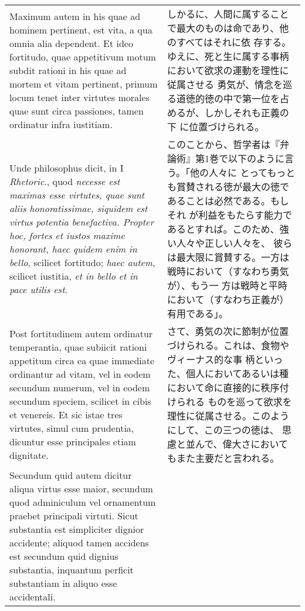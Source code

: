 \documentclass[10pt]{jsarticle}
\begin{document}
\begin{longtable}{p{21em}p{21em}}
\\


Maximum autem in his quae ad hominem pertinent, est vita, a qua omnia
alia dependent. Et ideo fortitudo, quae appetitivum motum subdit
rationi in his quae ad mortem et vitam pertinent, primum locum tenet
inter virtutes morales quae sunt circa passiones, tamen ordinatur
infra iustitiam.

&

しかるに、人間に属することで最大のものは命であり、他のすべてはそれに依
存する。ゆえに、死と生に属する事柄において欲求の運動を理性に従属させる
勇気が、情念を巡る道徳的徳の中で第一位を占めるが、しかしそれも正義の下
に位置づけられる。

\\

Unde philosophus dicit, in I {\itshape Rhetoric}., quod {\itshape
necesse est maximas esse virtutes, quae sunt aliis honoratissimae,
siquidem est virtus potentia benefactiva. Propter hoc, fortes et
iustos maxime honorant, haec quidem enim in bello}, scilicet
fortitudo; {\itshape haec autem}, scilicet iustitia, {\itshape et in
bello et in pace utilis est}.

&

 このことから、哲学者は『弁論術』第1巻で以下のように言う。「他の人々に
 とってもっとも賞賛される徳が最大の徳であることは必然である。もしそれ
 が利益をもたらす能力であるとすれば。このため、強い人々や正しい人々を、
 彼らは最大限に賞賛する。一方は戦時において（すなわち勇気が）、もう一
 方は戦時と平時において（すなわち正義が）有用である」。

\\



Post fortitudinem autem ordinatur temperantia, quae subiicit rationi
appetitum circa ea quae immediate ordinantur ad vitam, vel in eodem
secundum numerum, vel in eodem secundum speciem, scilicet in cibis et
venereis. Et sic istae tres virtutes, simul cum prudentia, dicuntur
esse principales etiam dignitate.


&

 さて、勇気の次に節制が位置づけられる。これは、食物やヴィーナス的な事
 柄といった、個人においてあるいは種において命に直接的に秩序付けられる
 ものを巡って欲求を理性に従属させる。このようにして、この三つの徳は、
 思慮と並んで、偉大さにおいてもまた主要だと言われる。

\\



Secundum quid autem dicitur aliqua virtus esse maior, secundum quod
adminiculum vel ornamentum praebet principali virtuti. Sicut
substantia est simpliciter dignior accidente; aliquod tamen accidens
est secundum quid dignius substantia, inquantum perficit substantiam
in aliquo esse accidentali.



\end{longtable}
\end{document}
